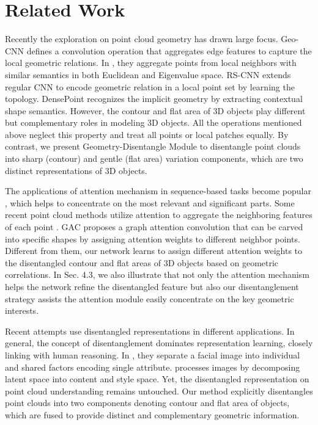 \documentclass[letterpaper]{article} \usepackage{aaai21}  \usepackage{times}  \usepackage{helvet} \usepackage{courier}  \usepackage[hyphens]{url}  \usepackage{graphicx} \urlstyle{rm} \def\UrlFont{\rm}  \usepackage{natbib}  \usepackage{caption} \frenchspacing  \setlength{\pdfpagewidth}{8.5in}  \setlength{\pdfpageheight}{11in}  \usepackage{color}
\begin{document}
\section{Related Work}


Recently the exploration on point cloud geometry has drawn large focus. Geo-CNN \cite{Lan_2019_CVPR} defines a convolution operation that aggregates edge features to capture the local geometric relations. In \cite{xu2020geometry}, they aggregate points from local neighbors with similar semantics in both Euclidean and Eigenvalue space. RS-CNN \cite{liu2019rscnn} extends regular CNN to encode geometric relation in a local point set by learning the topology. DensePoint \cite{liu2019densepoint} recognizes the implicit geometry by extracting contextual shape semantics. However, the contour and flat area of 3D objects play different but complementary roles in modeling 3D objects. All the operations mentioned above neglect this property and treat all points or local patches equally. By contrast, we present Geometry-Disentangle Module to disentangle point clouds into sharp (contour) and gentle (flat area) variation components, which are two distinct representations of 3D objects. 


The applications of attention mechanism in sequence-based tasks become popular \cite{NIPS2017_7181}, which helps to concentrate on the most relevant and significant parts. Some recent point cloud methods utilize attention to aggregate the neighboring features of each point \cite{point2sequence}. GAC \cite{gac_2019_CVPR} proposes a graph attention convolution that can be carved into specific shapes by assigning attention weights to different neighbor points. 
Different from them, our network learns to assign different attention weights to the disentangled contour and flat areas of 3D objects based on geometric correlations. In Sec. 4.3, we also illustrate that not only the attention mechanism helps the network refine the disentangled feature but also our disentanglement strategy assists the attention module easily concentrate on the key geometric interests.

Recent attempts use disentangled representations in different applications. In general, the concept of disentanglement \cite{bengio2012representation} dominates representation learning, closely linking with human reasoning. In \cite{Xiao_2018_ECCV}, they separate a facial image into individual and shared factors encoding single attribute. \cite{Huang_2018_ECCV} processes images by decomposing latent space into content and style space. 
Yet, the disentangled representation on point cloud understanding remains untouched. Our method explicitly disentangles point clouds into two components denoting contour and flat area of objects, which are fused to provide distinct and complementary geometric information. 
\end{document}
